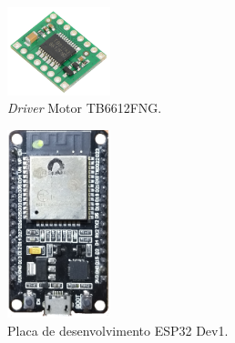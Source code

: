 \begin{figure}[H]
    \centering
    \includegraphics[width=3cm]{imagens/eletronica/driver.jpg}
    \caption{\textit{Driver} Motor TB6612FNG.}
    \label{fig:driver_motor}
\end{figure}

\begin{figure}[H]
    \centering
    \includegraphics[width=3cm]{imagens/eletronica/esp32_kit.png}
    \caption{Placa de desenvolvimento ESP32 Dev1.}
    \label{fig:esp32_kit}
\end{figure}